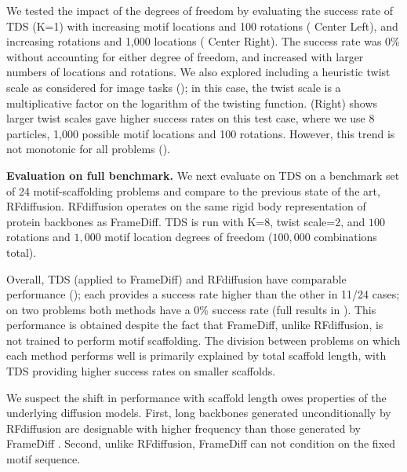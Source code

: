 We tested the impact of the degrees of freedom by evaluating the success rate of TDS (K=1) with increasing motif locations and 100 rotations ( Center Left), 
and increasing rotations and 1{,}000 locations ( Center Right).
The success rate was 0\% without accounting for either degree of freedom, and increased with larger numbers of locations and rotations.
We also explored including a heuristic twist scale as considered for image tasks ();
in this case, the twist scale is a multiplicative factor on the logarithm of the twisting function.
  (Right) shows larger twist scales gave higher success rates on this test case, where we use 8 particles, 1,000 possible motif locations and 100 rotations.
However, this trend is not monotonic for all problems ().


\textbf{Evaluation on full benchmark.}
We next evaluate on TDS on a benchmark set of 24 motif-scaffolding problems \citep{watson2022broadly} and compare to the previous state of the art, RFdiffusion.
RFdiffusion operates on the same rigid body representation of protein backbones as FrameDiff.
TDS is run with K=8, twist scale=2, and 
$100$ rotations and $1{,}000$ motif location degrees of freedom ($100{,}000$ combinations total). 

Overall, TDS (applied to FrameDiff) and RFdiffusion have comparable performance 
();
each provides a success rate higher than the other in 11/24 cases; on two problems both methods have a  0\% success rate (full results in ).
This performance is obtained despite the fact that FrameDiff, unlike RFdiffusion, is not trained to perform motif scaffolding.
The division between problems on which each method performs well is primarily explained by total scaffold length, with TDS providing higher success rates on smaller scaffolds.

We suspect the shift in performance with scaffold length owes properties of the underlying diffusion models.
First, long backbones generated unconditionally by RFdiffusion are designable with higher frequency than those generated by FrameDiff \citep{yim2023se}.
Second, unlike RFdiffusion, FrameDiff can not condition on the fixed motif sequence.

